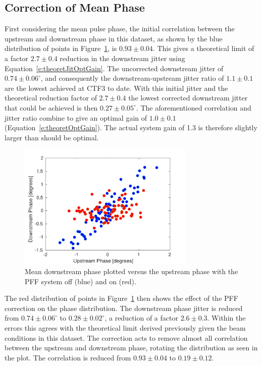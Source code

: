\subsection{Correction of Mean Phase}
\label{ss:bestMeanJitter}

First considering the mean pulse phase, the initial correlation between the upstream and downstream phase in this dataset, as shown by the blue distribution of points in Figure~\ref{f:BestFF_Real}, is \(0.93\pm0.04\). This gives a theoretical limit of a factor \(2.7\pm0.4\) reduction in the downstream jitter using Equation~\ref{e:theoretJitOptGain}. The uncorrected downstream jitter of \(0.74\pm0.06^\circ\), and consequently the downstream-upstream jitter ratio of \(1.1\pm0.1\) are the lowest achieved at CTF3 to date. With this initial jitter and the theoretical reduction factor of \(2.7\pm0.4\) the lowest corrected downstream jitter that could be achieved is then \(0.27\pm0.05^\circ\). The aforementioned correlation and jitter ratio combine to give an optimal gain of \(1.0\pm0.1\) (Equation~\ref{e:theoretOptGain}). The actual system gain of 1.3 is therefore slightly larger than should be optimal.

\begin{figure}
  \centering
  \includegraphics[width=0.75\textwidth]{Figures/feedforward/BestFF_Real}
  \caption{Mean downstream phase plotted versus the upstream phase with the PFF system off (blue) and on (red).}
  \label{f:BestFF_Real}
\end{figure}

The red distribution of points in Figure~\ref{f:BestFF_Real} then shows the effect of the PFF correction on the phase distribution. The downstream phase jitter is reduced from \(0.74\pm0.06^\circ\) to \(0.28\pm0.02^\circ\), a reduction of a factor \(2.6\pm0.3\). Within the errors this agrees with the theoretical limit derived previously given the beam conditions in this dataset. The correction acts to remove almost all correlation between the upstream and downstream phase, rotating the distribution as seen in the plot. The correlation is reduced from \(0.93\pm0.04\) to \(0.19\pm0.12\).

